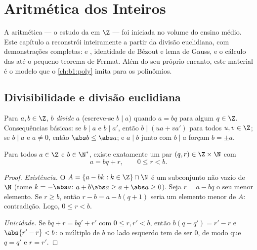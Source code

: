 \chapter{Aritmética dos Inteiros}\label{ch:b1:arith}

A aritmética --- o estudo da  em $\Z$ --- foi iniciada no
volume do ensino médio. Este capítulo a reconstrói inteiramente a partir
da divisão euclidiana, com demonstrações completas: 
e , identidade de Bézout e lema de Gauss,
 e o cálculo das  até o pequeno teorema
de Fermat. Além do seu próprio encanto, este material é o modelo que o
\cref{ch:b1:poly} imita para os polinômios.

\section{Divisibilidade e divisão euclidiana}

\begin{definition}[Divisibilidade]\label{def:b1:arith:divides}
Para $a, b \in \Z$, $b$ \emph{divide} $a$ (escreve-se $b \mid
a$) quando $a = bq$ para algum $q \in \Z$.
Consequências básicas: se $b \mid a$ e $b \mid a'$, então $b \mid (ua + va')$
para todos $u, v \in \Z$; se $b \mid a$ e $a \neq 0$, então $\abs b \leq
\abs a$; e $a \mid b$ junto com $b \mid a$ forçam $b = \pm a$.
\end{definition}

\begin{theorem}\label{thm:b1:arith:division}
Para todos $a \in \Z$ e $b \in \N^*$, existe exatamente um par $(q, r)
\in \Z \times \N$ com
\[
a = bq + r, \qquad 0 \leq r < b .
\]
\end{theorem}

\begin{proof}
\emph{Existência.} O  $A = \{a - bk : k \in \Z\} \cap \N$ é um
subconjunto não vazio de $\N$ (tome $k = -\abs a$: $a + b\abs a \geq a +
\abs a \geq 0$). Seja $r = a - bq$ o seu menor elemento. Se $r \geq b$,
então $r - b = a - b(q+1)$ seria um elemento menor de $A$:
contradição. Logo, $0 \leq r < b$.

\emph{Unicidade.} Se $bq + r = bq' + r'$ com $0 \leq r, r' < b$,
então $b(q - q') = r' - r$ e $\abs{r' - r} < b$: o múltiplo de $b$
no lado esquerdo tem de ser $0$, de modo que $q = q'$ e $r = r'$.
\end{proof}

